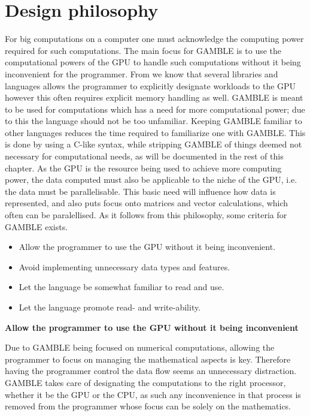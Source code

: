 \section{Design philosophy}
For big computations on a computer one must acknowledge the computing power required for such computations.
The main focus for GAMBLE is to use the computational powers of the GPU to handle such computations without it being inconvenient for the programmer.
From  we know that several libraries and languages allows the programmer to explicitly designate workloads to the GPU however this often requires explicit memory handling as well.
GAMBLE is meant to be used for computations which has a need for more computational power; due to this the language should not be too unfamiliar.
Keeping GAMBLE familiar to other languages reduces the time required to familiarize one with GAMBLE.
This is done by using a C-like syntax, while stripping GAMBLE of things deemed not necessary for computational needs, as will be documented in the rest of this chapter.
As the GPU is the resource being used to achieve more computing power, the data computed must also be applicable to the niche of the GPU, i.e. the data must be parallelisable.
This basic need will influence how data is represented, and also puts focus onto matrices and vector calculations, which often can be paralellised.
As it follows from this philosophy, some criteria for GAMBLE exists.
\begin{itemize}
	\item Allow the programmer to use the GPU without it being inconvenient.
	\item Avoid implementing unnecessary data types and features.
	\item Let the language be somewhat familiar to read and use.
	\item Let the language promote read- and write-ability.
\end{itemize}

\textbf{Allow the programmer to use the GPU without it being inconvenient}

Due to GAMBLE being focused on numerical computations, allowing the programmer to focus on managing the mathematical aspects is key.
Therefore having the programmer control the data flow seems an unnecessary distraction.
GAMBLE takes care of designating the computations to the right processor, whether it be the GPU or the CPU, as such any inconvenience in that process is removed from the programmer whose focus can be solely on the mathematics.

